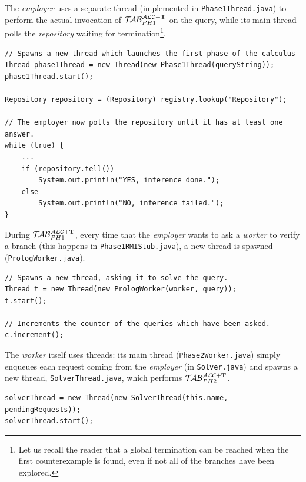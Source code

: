 \documentclass[a4paper, 11pt, oneside]{duthesis}
\newcommand{\tip}{{\bf T}}
\newcommand{\primo}{\mathrel{{\mathcal{T}\!\mathcal{AB}}}_{PH 1}^{\mathcal{ALC}+\mbox{\scriptsize $\tip$}}}
\newcommand{\secondo}{\mathrel{{\mathcal{T}\!\mathcal{AB}}}_{PH 2}^{\mathcal{ALC}+\mbox{\scriptsize $\tip$}}}
\begin{document}
The \emph{employer} uses a separate thread (implemented in \verb$Phase1Thread.java$) to perform the actual invocation of $\primo$ on the query, while its main thread polls the \emph{repository} waiting for termination\footnote{Let us recall the reader that a global termination can be reached when the first counterexample is found, even if not all of the branches have been explored.}.

\begin{lstlisting}[caption={Employer.java}, label={lst:employer}, firstnumber=116]
// Spawns a new thread which launches the first phase of the calculus
Thread phase1Thread = new Thread(new Phase1Thread(queryString));
phase1Thread.start();

Repository repository = (Repository) registry.lookup("Repository");
		
// The employer now polls the repository until it has at least one answer.
while (true) {
	...
	if (repository.tell())
		System.out.println("YES, inference done.");
	else
		System.out.println("NO, inference failed.");
}
\end{lstlisting}\vspace{0.5cm}

\newpage

During $\primo$, every time that the \emph{employer} wants to ask a \emph{worker} to verify a branch (this happens in \verb$Phase1RMIStub.java$), a new thread is spawned (\verb$PrologWorker.java$).

\begin{lstlisting}[caption={Phase1RMIStub.java}, label={lst:phase1rmi}, firstnumber=68]
// Spawns a new thread, asking it to solve the query.
Thread t = new Thread(new PrologWorker(worker, query));
t.start();

// Increments the counter of the queries which have been asked.
c.increment();
\end{lstlisting}\vspace{0.5cm}

The \emph{worker} itself uses threads: its main thread (\verb$Phase2Worker.java$) simply enqueues each request coming from the \emph{employer} (in \verb$Solver.java$) and spawns a new thread, \verb$SolverThread.java$, which performs $\secondo$.

\begin{lstlisting}[caption={Solver.java}, label={lst:solver}, firstnumber=38]
solverThread = new Thread(new SolverThread(this.name, pendingRequests));
solverThread.start();
\end{lstlisting}\vspace{0.5cm}
\end{document}
